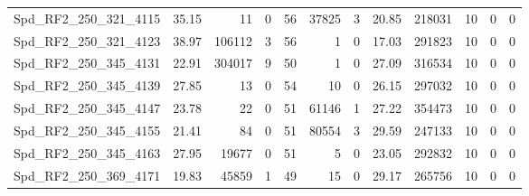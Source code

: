 \begin{longtable}[c]{@{}lrrrrrrrrrrr@{}}
Spd\_RF2\_250\_321\_4115      & 35.15                  & 11                      & 0                       & 56                     & 37825                   & 3                       & 20.85                   & 218031                   & 10                       & 0                        & 0                        \\
Spd\_RF2\_250\_321\_4123      & 38.97                  & 106112                  & 3                       & 56                     & 1                       & 0                       & 17.03                   & 291823                   & 10                       & 0                        & 0                        \\
Spd\_RF2\_250\_345\_4131      & 22.91                  & 304017                  & 9                       & 50                     & 1                       & 0                       & 27.09                   & 316534                   & 10                       & 0                        & 0                        \\
Spd\_RF2\_250\_345\_4139      & 27.85                  & 13                      & 0                       & 54                     & 10                      & 0                       & 26.15                   & 297032                   & 10                       & 0                        & 0                        \\
Spd\_RF2\_250\_345\_4147      & 23.78                  & 22                      & 0                       & 51                     & 61146                   & 1                       & 27.22                   & 354473                   & 10                       & 0                        & 0                        \\
Spd\_RF2\_250\_345\_4155      & 21.41                  & 84                      & 0                       & 51                     & 80554                   & 3                       & 29.59                   & 247133                   & 10                       & 0                        & 0                        \\
Spd\_RF2\_250\_345\_4163      & 27.95                  & 19677                   & 0                       & 51                     & 5                       & 0                       & 23.05                   & 292832                   & 10                       & 0                        & 0                        \\
Spd\_RF2\_250\_369\_4171      & 19.83                  & 45859                   & 1                       & 49                     & 15                      & 0                       & 29.17                   & 265756                   & 10                       & 0                        & 0                        \\

\end{longtable}
